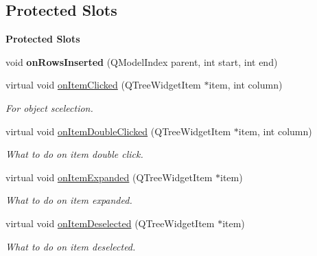 \subsection*{Protected Slots}
\begin{Indent}\textbf{ Protected Slots}\par
\begin{DoxyCompactItemize}
\item 
\mbox{\label{classrev_1_1_view_1_1_tree_widget_ac45965c6d4333adf060409ac8a3949f4}} 
void {\bfseries on\+Rows\+Inserted} (Q\+Model\+Index parent, int start, int end)
\item 
\mbox{\label{classrev_1_1_view_1_1_tree_widget_a8b6172dcd7b7990944bb04346ef49912}} 
virtual void \mbox{\hyperlink{classrev_1_1_view_1_1_tree_widget_a8b6172dcd7b7990944bb04346ef49912}{on\+Item\+Clicked}} (Q\+Tree\+Widget\+Item $\ast$item, int column)
\begin{DoxyCompactList}\small\item\em For object scelection. \end{DoxyCompactList}\item 
\mbox{\label{classrev_1_1_view_1_1_tree_widget_a0b9077c63cc1839e75106ead0349ea46}} 
virtual void \mbox{\hyperlink{classrev_1_1_view_1_1_tree_widget_a0b9077c63cc1839e75106ead0349ea46}{on\+Item\+Double\+Clicked}} (Q\+Tree\+Widget\+Item $\ast$item, int column)
\begin{DoxyCompactList}\small\item\em What to do on item double click. \end{DoxyCompactList}\item 
\mbox{\label{classrev_1_1_view_1_1_tree_widget_a3a0ce22a8de8c7c65bbfaa7a27bd3ea0}} 
virtual void \mbox{\hyperlink{classrev_1_1_view_1_1_tree_widget_a3a0ce22a8de8c7c65bbfaa7a27bd3ea0}{on\+Item\+Expanded}} (Q\+Tree\+Widget\+Item $\ast$item)
\begin{DoxyCompactList}\small\item\em What to do on item expanded. \end{DoxyCompactList}\item 
\mbox{\label{classrev_1_1_view_1_1_tree_widget_a5cbf39b0d7ee9fca6dc55aecdee30910}} 
virtual void \mbox{\hyperlink{classrev_1_1_view_1_1_tree_widget_a5cbf39b0d7ee9fca6dc55aecdee30910}{on\+Item\+Deselected}} (Q\+Tree\+Widget\+Item $\ast$item)
\begin{DoxyCompactList}\small\item\em What to do on item deselected. \end{DoxyCompactList}\end{DoxyCompactItemize}
\end{Indent}
